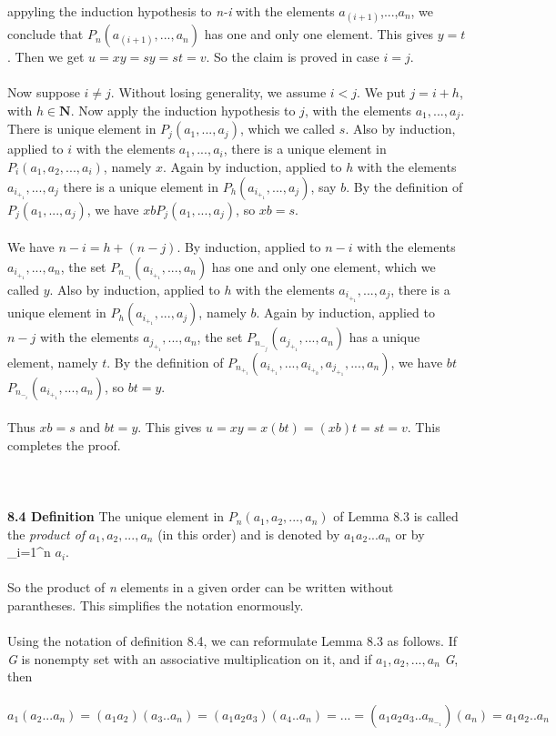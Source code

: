 \documentclass[11pt]{amsbook}
\begin{document}
\noindent appyling the induction hypothesis to \emph{n-i} with the elements $a_(i+1)$,...,$a_n$, we conclude that $P_n(a_(i+1),...,a_n)$ has one and only one element. This gives $y=t$. Then we get $u=xy=sy=st=v$. So the claim is proved in case $i=j$. \\ \\
\noindent Now suppose $i \neq j$. Without losing generality, we assume $i<j$. We put $j=i+h$, with $ h \in \mathbf N $. Now apply the induction hypothesis to $j$, with the elements $a_1,...,a_j$. There is unique element in $P_j(a_1,...,a_j)$, which we called $s$. Also by induction, applied to $i$ with the elements $a_1,...,a_i$, there is a unique element in $P_i(a_1,a_2,...,a_i)$, namely $x$. Again by induction, applied to $h$ with the elements $a_i_+_1,...,a_j$ there is a unique element in $P_h(a_i_+_1,...,a_j)$, say $b$. By the definition of $P_j(a_1,...,a_j)$, we have $ xb$\in $P_j(a_1,...,a_j)$, so $xb=s$. \\ \\
\noindent We have $n-i=h+(n-j)$. By induction, applied to $n-i$ with the elements $a_i_+_1,...,a_n$, the set $P_n_-_i(a_i_+_1,...,a_n)$ has one and only one element, which we called $y$. Also by induction, applied to $h$ with the elements $a_i_+_1,...,a_j$, there is a unique element in $P_h(a_i_+_1,...,a_j)$, namely $b$. Again by induction, applied to $n-j$ with the elements $a_j_+_1,...,a_n$, the set $P_n_-_j(a_j_+_1,...,a_n)$ has a unique element, namely $t$. By the definition of $P_n_+_i(a_i_+_1,...,a_i_+_h,a_j_+_1,...,a_n)$, we have $bt$ \in $P_n_-_i(a_i_+_1,...,a_n)$, so $bt=y$. \\ \\
\noindent Thus $xb=s$ and $bt=y$. This gives $u=xy=x(bt)=(xb)t=st=v$. This completes the proof. \\ \\ \\ \\
\noindent \textbf{8.4 Definition}  The unique element in $P_n(a_1,a_2,...,a_n)$ of Lemma $8.3$ is called the \emph{product of} $a_1,a_2,...,a_n$ (in this order) and is denoted by $a_1a_2...a_n$ or by \left\prod\limits_{i=1}^n $a_i$. \\ \\
\noindent So the product of \emph{n} elements in a given order can be written without parantheses. This simplifies the notation enormously. \\ \\
\noindent Using the notation of definition 8.4, we can reformulate Lemma 8.3 as follows. If \emph{G} is nonempty set with an associative multiplication on it, and if $a_1,a_2,...,a_n$ \in \emph{G}, then \\ \\
\noindent $a_1(a_2...a_n)=(a_1a_2)(a_3..a_n)=(a_1a_2a_3)(a_4..a_n)=...=(a_1a_2a_3..a_n_-_1)(a_n)=a_1a_2..a_n$







\end{document}
